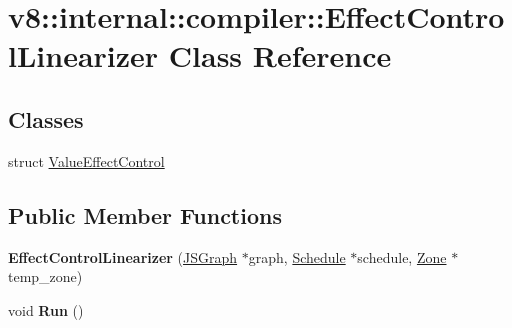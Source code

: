 \hypertarget{classv8_1_1internal_1_1compiler_1_1_effect_control_linearizer}{}\section{v8\+:\+:internal\+:\+:compiler\+:\+:Effect\+Control\+Linearizer Class Reference}
\label{classv8_1_1internal_1_1compiler_1_1_effect_control_linearizer}
\subsection*{Classes}
\begin{DoxyCompactItemize}
\item 
struct \hyperlink{structv8_1_1internal_1_1compiler_1_1_effect_control_linearizer_1_1_value_effect_control}{Value\+Effect\+Control}
\end{DoxyCompactItemize}
\subsection*{Public Member Functions}
\begin{DoxyCompactItemize}
\item 
{\bfseries Effect\+Control\+Linearizer} (\hyperlink{classv8_1_1internal_1_1compiler_1_1_j_s_graph}{J\+S\+Graph} $\ast$graph, \hyperlink{classv8_1_1internal_1_1compiler_1_1_schedule}{Schedule} $\ast$schedule, \hyperlink{classv8_1_1internal_1_1_zone}{Zone} $\ast$temp\+\_\+zone)\hypertarget{classv8_1_1internal_1_1compiler_1_1_effect_control_linearizer_a887f7195e739a039bd3150698754ffbf}{}\label{classv8_1_1internal_1_1compiler_1_1_effect_control_linearizer_a887f7195e739a039bd3150698754ffbf}

\item 
void {\bfseries Run} ()\hypertarget{classv8_1_1internal_1_1compiler_1_1_effect_control_linearizer_a0b8094e555107a310d24e6160255acc3}{}\label{classv8_1_1internal_1_1compiler_1_1_effect_control_linearizer_a0b8094e555107a310d24e6160255acc3}

\end{DoxyCompactItemize}
